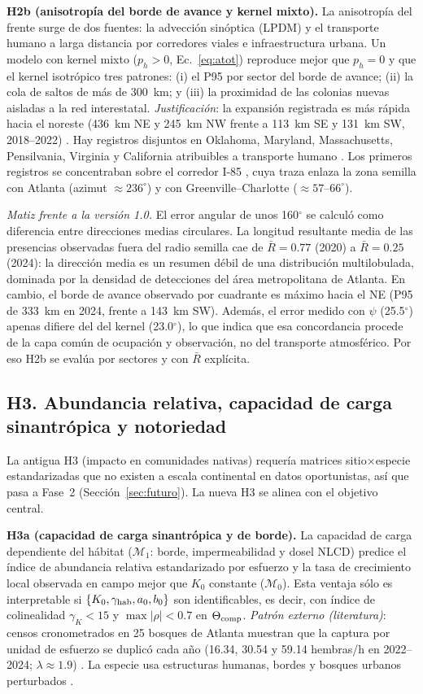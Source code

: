\documentclass[11pt,letterpaper]{article}
\begin{document}
\textbf{H2b (anisotropía del borde de avance y kernel mixto).} La anisotropía del frente surge de dos fuentes: la advección sinóptica (LPDM) y el transporte humano a larga distancia por corredores viales e infraestructura urbana. Un modelo con kernel mixto ($p_h>0$, Ec.~\ref{eq:atot}) reproduce mejor que $p_h=0$ y que el kernel isotrópico tres patrones: (i) el P95 por sector del borde de avance; (ii) la cola de saltos de más de 300~km; y (iii) la proximidad de las colonias nuevas aisladas a la red interestatal.
\emph{Justificación}: la expansión registrada es más rápida hacia el noreste (436~km NE y 245~km NW frente a 113~km SE y 131~km SW, 2018--2022) \cite{nelsen2023}. Hay registros disjuntos en Oklahoma, Maryland, Massachusetts, Pensilvania, Virginia y California atribuibles a transporte humano \cite{chuang2023,chuang2025,harman2025}. Los primeros registros se concentraban sobre el corredor I-85 \cite{hoebeke2015}, cuya traza enlaza la zona semilla con Atlanta (azimut $\approx236^\circ$) y con Greenville--Charlotte ($\approx57$--$66^\circ$).

\textit{Matiz frente a la versión 1.0.} El error angular de unos 160$^\circ$ se calculó como diferencia entre direcciones medias circulares. La longitud resultante media de las presencias observadas fuera del radio semilla cae de $\bar R=0.77$ (2020) a $\bar R=0.25$ (2024): la dirección media es un resumen débil de una distribución multilobulada, dominada por la densidad de detecciones del área metropolitana de Atlanta. En cambio, el borde de avance observado por cuadrante es máximo hacia el NE (P95 de 333~km en 2024, frente a 143~km SW). Además, el error medido con $\psi$ (25.5$^\circ$) apenas difiere del del kernel (23.0$^\circ$), lo que indica que esa concordancia procede de la capa común de ocupación y observación, no del transporte atmosférico. Por eso H2b se evalúa por sectores y con $\bar R$ explícita.

\subsection{H3. Abundancia relativa, capacidad de carga sinantrópica y notoriedad}
La antigua H3 (impacto en comunidades nativas) requería matrices sitio$\times$especie estandarizadas que no existen a escala continental en datos oportunistas, así que pasa a Fase~2 (Sección~\ref{sec:futuro}). La nueva H3 se alinea con el objetivo central.

\textbf{H3a (capacidad de carga sinantrópica y de borde).} La capacidad de carga dependiente del hábitat ($\mathcal M_1$: borde, impermeabilidad y dosel NLCD) predice el índice de abundancia relativa estandarizado por esfuerzo y la tasa de crecimiento local observada en campo mejor que $K_0$ constante ($\mathcal M_0$). Esta ventaja sólo es interpretable si $\{K_0,\gamma_{\rm hab},a_0,b_0\}$ son identificables, es decir, con índice de colinealidad $\gamma_K<15$ y $\max|\rho|<0.7$ en $\Theta_{\rm comp}$.
\emph{Patrón externo (literatura)}: censos cronometrados en 25 bosques de Atlanta muestran que la captura por unidad de esfuerzo se duplicó cada año (16.34, 30.54 y 59.14 hembras/h en 2022--2024; $\lambda\approx1.9$) \cite{pemberton2025}. La especie usa estructuras humanas, bordes y bosques urbanos perturbados \cite{hoebeke2015,chuang2025}.
\end{document}
